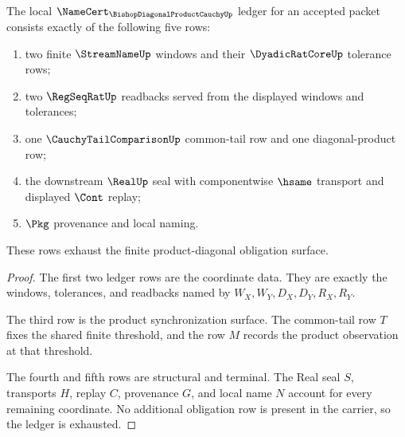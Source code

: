 \begin{theorem}
\label{thm:bishop-diagonal-product-cauchy-ledger}
The local $\NameCert_{\BishopDiagonalProductCauchyUp}$ ledger for an accepted packet consists exactly of the following five rows:
\begin{enumerate}
\item two finite $\StreamNameUp$ windows and their $\DyadicRatCoreUp$ tolerance rows;
\item two $\RegSeqRatUp$ readbacks served from the displayed windows and tolerances;
\item one $\CauchyTailComparisonUp$ common-tail row and one diagonal-product row;
\item the downstream $\RealUp$ seal with componentwise $\hsame$ transport and displayed $\Cont$ replay;
\item $\Pkg$ provenance and local naming.
\end{enumerate}
These rows exhaust the finite product-diagonal obligation surface.
\end{theorem}
\begin{proof}
The first two ledger rows are the coordinate data. They are exactly the windows, tolerances, and readbacks named by $W_X,W_Y,D_X,D_Y,R_X,R_Y$.

The third row is the product synchronization surface. The common-tail row $T$ fixes the shared finite threshold, and the row $M$ records the product observation at that threshold.

The fourth and fifth rows are structural and terminal. The Real seal $S$, transports $H$, replay $C$, provenance $G$, and local name $N$ account for every remaining coordinate. No additional obligation row is present in the carrier, so the ledger is exhausted.
\end{proof}



